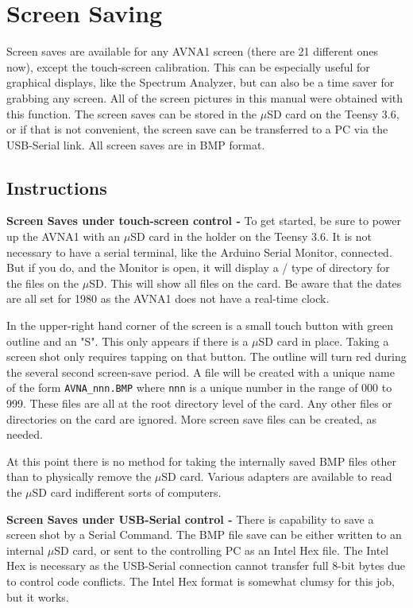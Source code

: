 \section{Screen Saving}
\label{sect:SSave}
Screen saves are available for any AVNA1 screen (there are 21 different ones now), except the touch-screen calibration.   This can be especially useful for graphical displays, like the Spectrum Analyzer, but can also be a time saver for grabbing any screen.  All of the screen pictures in this manual were obtained with this function.  The screen saves can be stored in the $\mu$SD card on the Teensy 3.6, or if that is not convenient, the screen save can be transferred  to a PC  via the USB-Serial link.  All screen saves are in BMP format.

\subsection{Instructions}
\label{subsect:SSaveInstr}
\textbf{Screen Saves under touch-screen control - } To get started,  be sure to power up the AVNA1 with  an $\mu$SD card in the holder on the Teensy 3.6.  It is not necessary to have a serial terminal, like the Arduino Serial Monitor, connected.  But if you do, and the Monitor is open, it will display a  /  type of directory for the files on the $\mu$SD.  This will show all files on the card.   Be aware that the dates are all set for 1980 as the AVNA1 does not have a real-time clock.

In the upper-right hand corner of the screen is a small touch button with green outline and an "S".  This only appears if there is a $\mu$SD card in place.  Taking a screen shot only requires tapping on that button.  The outline will turn red during the several second screen-save period.  A file will be created with a unique name of 
the form \texttt{AVNA\_nnn.BMP} where \texttt{nnn} is a unique number in the range of 000 to 999.  These files are all at the root directory level of the card.  Any other files or directories on the card are ignored.  More screen save files can be created, as needed.

At this point there is no method for taking the internally saved BMP files other than to physically remove the $\mu$SD card.  Various adapters are available to read the  $\mu$SD card indifferent sorts of computers.

\textbf{Screen Saves under USB-Serial control - } There is capability to save a screen shot by a Serial Command.  The BMP file save can be either written to an internal $\mu$SD card, or  sent to the controlling PC as an Intel Hex file.  The Intel Hex is necessary as the USB-Serial connection cannot transfer full 8-bit bytes due to control code conflicts.  The Intel Hex format is somewhat clumsy for this job, but it works.  

